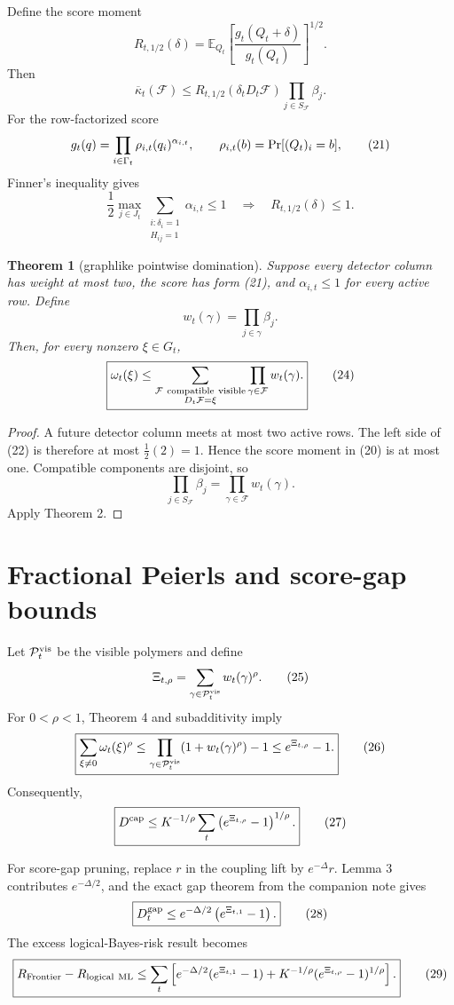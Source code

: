 \documentclass[11pt]{article}
\newtheorem{theorem}{Theorem}
\newcommand{\E}{\mathbb E}
\newcommand{\Prb}{\mathop{\rm Pr}}
\newcommand{\1}{\mathbf 1}
\begin{document}
Define the score moment
\[
 R_{t,1/2}(\delta)
 =
 \E_{Q_t}
 \left[
 \frac{g_t(Q_t+\delta)}{g_t(Q_t)}
 \right]^{1/2}.
\tag{19}
\]
Then
\[
 \overline\kappa_t(\mathcal F)
 \le
 R_{t,1/2}(\delta_tD_t\mathcal F)
 \prod_{j\in S_{\mathcal F}}\beta_j.
\tag{20}
\]
For the row-factorized score
\[
 g_t(q)
 =
 \prod_{i\in\Gamma_t}
 \rho_{i,t}(q_i)^{\alpha_{i,t}},
 \qquad
 \rho_{i,t}(b)=\Prb[(Q_t)_i=b],
\tag{21}
\]
Finner's inequality gives
\[
 \frac12
 \max_{j\in J_t}
 \sum_{\substack{i:\delta_i=1\\H_{ij}=1}}\alpha_{i,t}
 \le1
 \quad\Longrightarrow\quad
 R_{t,1/2}(\delta)\le1.
\tag{22}
\]

\begin{theorem}[graphlike pointwise domination]
Suppose every detector column has weight at most two, the score has form
(21), and \(\alpha_{i,t}\le1\) for every active row.  Define
\[
 w_t(\gamma)=\prod_{j\in\gamma}\beta_j.
\tag{23}
\]
Then, for every nonzero \(\xi\in G_t\),
\[
\boxed{
 \omega_t(\xi)
 \le
 \sum_{\substack{
 \mathcal F\ {\rm compatible\ visible}\\
 D_t\mathcal F=\xi}}
 \prod_{\gamma\in\mathcal F}w_t(\gamma).}
\tag{24}
\]
\end{theorem}

\begin{proof}
A future detector column meets at most two active rows.  The left side of
(22) is therefore at most \(\frac12(2)=1\).  Hence the score moment in
(20) is at most one.  Compatible components are disjoint, so
\[
 \prod_{j\in S_{\mathcal F}}\beta_j
 =
 \prod_{\gamma\in\mathcal F}w_t(\gamma).
\]
Apply Theorem 2.
\end{proof}

\section{Fractional Peierls and score-gap bounds}

Let \(\mathcal P_t^{\rm vis}\) be the visible polymers and define
\[
 \Xi_{t,\rho}
 =
 \sum_{\gamma\in\mathcal P_t^{\rm vis}}w_t(\gamma)^\rho.
\tag{25}
\]
For \(0<\rho<1\), Theorem 4 and subadditivity imply
\[
\boxed{
 \sum_{\xi\ne0}\omega_t(\xi)^\rho
 \le
 \prod_{\gamma\in\mathcal P_t^{\rm vis}}
 (1+w_t(\gamma)^\rho)-1
 \le e^{\Xi_{t,\rho}}-1.}
\tag{26}
\]
Consequently,
\[
\boxed{
 D^{\rm cap}
 \le
 K^{-1/\rho}\sum_t
 \left(e^{\Xi_{t,\rho}}-1\right)^{1/\rho}.}
\tag{27}
\]

For score-gap pruning, replace \(r\) in the coupling lift by
\(e^{-\Delta}r\).  Lemma 3 contributes \(e^{-\Delta/2}\), and the exact
gap theorem from the companion note gives
\[
\boxed{
 D_t^{\rm gap}
 \le
 e^{-\Delta/2}\left(e^{\Xi_{t,1}}-1\right).}
\tag{28}
\]
The excess logical-Bayes-risk result becomes
\[
\boxed{
 R_{\rm Frontier}-R_{\rm logical\ ML}
 \le
 \sum_t\left[
 e^{-\Delta/2}(e^{\Xi_{t,1}}-1)
 +
 K^{-1/\rho}(e^{\Xi_{t,\rho}}-1)^{1/\rho}
 \right].}
\tag{29}
\]
\end{document}
